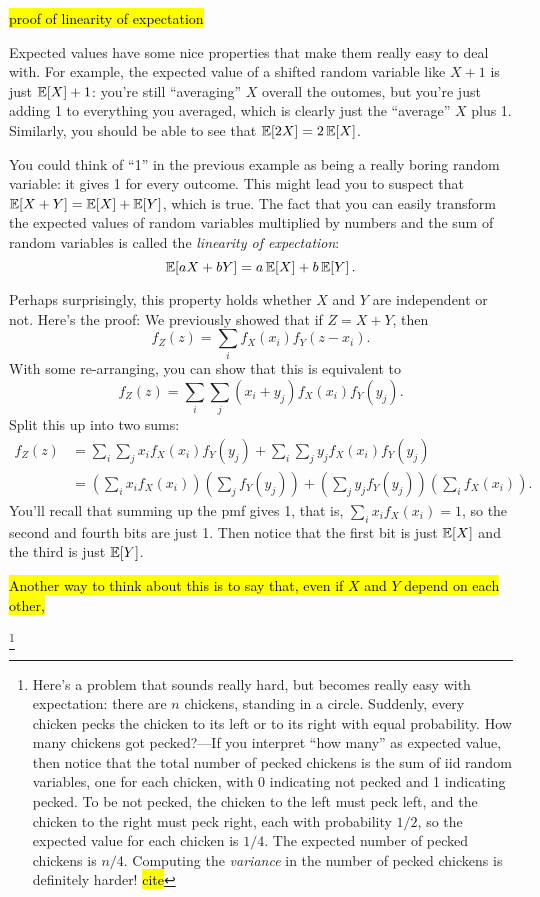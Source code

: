\hl{proof of linearity of expectation}

Expected values have some nice properties that make them really easy to deal
with. For example, the expected value of a shifted random variable like $X +
1$ is just $\mathbb{E}\!\left[{X}\right] + 1$: you're still ``averaging'' $X$ overall the
outomes, but you're just adding 1 to everything you averaged, which is clearly
just the ``average'' $X$ plus 1. Similarly, you should be able to see that
$\mathbb{E}\!\left[{2X}\right] = 2 \,\mathbb{E}\!\left[{X}\right]$.

You could think of ``1'' in the previous example as being a really boring
random variable: it gives 1 for every outcome. This might lead you to suspect
that $\mathbb{E}\!\left[{X + Y}\right] = \mathbb{E}\!\left[{X}\right] + \mathbb{E}\!\left[{Y}\right]$, which is true. The fact that
you can easily transform the expected values of random variables multiplied by
numbers and the sum of random variables is called the \emph{linearity of expectation}:
\begin{equation}
\mathbb{E}\!\left[{aX + bY}\right] = a \,\mathbb{E}\!\left[{X}\right] + b \,\mathbb{E}\!\left[{Y}\right].
\end{equation}

Perhaps surprisingly, this property holds whether $X$ and $Y$ are independent
or not. Here's the proof: We previously showed that if $Z = X + Y$, then
\begin{equation}
f_Z(z) = \sum_i f_X(x_i) f_Y(z - x_i).
\end{equation}
With some re-arranging, you can show that this is equivalent to
\begin{equation}
f_Z(z) = \sum_i \sum_j (x_i + y_j) f_X(x_i) f_Y(y_j).
\end{equation}
Split this up into two sums:
\begin{align*}
f_Z(z) &= \sum_i \sum_j x_i f_X(x_i) f_Y(y_j) + \sum_i \sum_j y_j f_X(x_i) f_Y(y_j) \\
  &= \left(\sum_i x_i f_X(x_i)\right) \left(\sum_j f_Y(y_j)\right) +
    \left(\sum_j y_j f_Y(y_j)\right) \left(\sum_i f_X(x_i)\right).
\end{align*}
You'll recall that summing up the pmf gives 1, that is, $\sum_i x_i f_X(x_i) =
1$, so the second and fourth bits are just 1. Then notice that the first bit is
just $\mathbb{E}\!\left[{X}\right]$ and the third is just $\mathbb{E}\!\left[{Y}\right]$.

\hl{Another way to think about this is to say that, even if $X$ and $Y$ depend on
each other,}

\footnote{Here's a problem that sounds really hard, but becomes
really easy with expectation: there are $n$ chickens, standing in a circle.
Suddenly, every chicken pecks the chicken to its left or to its right with
equal probability. How many chickens got pecked?---If you interpret ``how many''
as expected value, then notice that the total number of pecked chickens is the
sum of iid random variables, one for each chicken, with 0 indicating not pecked
and 1 indicating pecked. To be not pecked, the chicken to the left must peck
left, and the chicken to the right must peck right, each with probability
$1/2$, so the expected value for each chicken is $1/4$. The
expected number of pecked chickens is $n/4$. Computing the
\emph{variance} in the number of pecked chickens is definitely harder! \hl{cite}}

